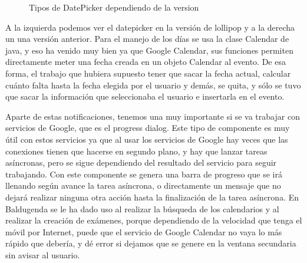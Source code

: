 \begin{figure}[H]
 \centering
 \caption{Tipos de DatePicker dependiendo de la version}
 \label{f:Tipos de DatePicker dependiendo de la version}
\end{figure}

A la izquierda podemos ver el datepicker en la versión de lollipop y a la derecha un una versión anterior.
Para el manejo de los días se usa la clase Calendar de java, y eso ha venido muy bien ya que Google Calendar, sus funciones permiten directamente meter una fecha creada en un objeto Calendar al evento.
De esa forma, el trabajo que hubiera supuesto tener que sacar la fecha actual, calcular cuánto falta hasta la fecha elegida por el usuario y demás, se quita, y sólo se tuvo que sacar la información que seleccionaba el usuario e insertarla en el evento.

Aparte de estas notificaciones, tenemos una muy importante si se va trabajar con servicios de Google, que es el progress dialog.
Este tipo de componente es muy útil con estos servicios ya que al usar los servicios de Google hay veces que las conexiones tienen que hacerse en segundo plano, y hay que lanzar tareas asíncronas, pero se sigue dependiendo del resultado del servicio para seguir trabajando.
Con este componente se genera una barra de progreso que se irá llenando según avance la tarea asíncrona, o directamente un mensaje que no dejará realizar ninguna otra acción hasta la finalización de la tarea asíncrona.
En Baldugenda se le ha dado uso al realizar la búsqueda de los calendarios y al realizar la creación de exámenes, porque dependiendo de la velocidad que tenga el móvil por Internet, puede que el servicio de Google Calendar no vaya lo más rápido que debería, y dé error si dejamos que se genere en la ventana secundaria sin avisar al usuario. 

